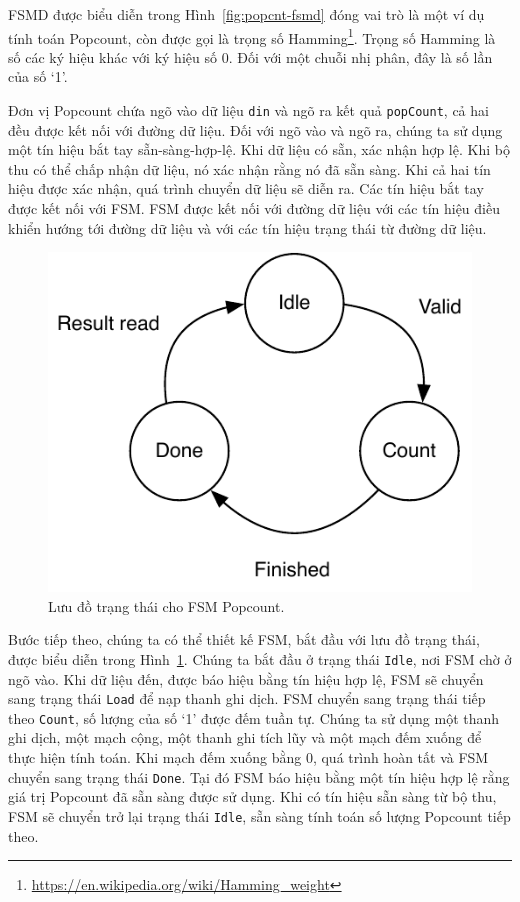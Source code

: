 \documentclass[%
    10pt,
    headinclude, footexclude,
    openright, %
    notitlepage,
    cleardoubleempty,
    headsepline,
    pointlessnumbers,
    bibtotoc, idxtotoc,
    ]{scrbook}
\newcommand{\code}[1]{{\small{\texttt{#1}}}}
\newcommand{\scale}{0.7}
\newcommand{\myref}[2]{\href{#1}{#2}}
\renewcommand{\myref}[2]{{#2}{\footnote{\url{#1}}}}
\begin{document}
FSMD được biểu diễn trong Hình~\ref{fig:popcnt-fsmd} đóng vai trò là một ví dụ tính toán Popcount, còn được gọi là \myref{https://en.wikipedia.org/wiki/Hamming_weight}{trọng số Hamming}. Trọng số Hamming là số các ký hiệu khác với ký hiệu số 0. Đối với một chuỗi nhị phân, đây là số lần của số `1'. 

Đơn vị Popcount chứa ngõ vào dữ liệu \code{din} và ngõ ra kết quả \code{popCount}, cả hai đều được kết nối với đường dữ liệu. Đối với ngõ vào và ngõ ra, chúng ta sử dụng một tín hiệu bắt tay sẵn-sàng-hợp-lệ. Khi dữ liệu có sẵn, xác nhận hợp lệ. Khi bộ thu có thể chấp nhận dữ liệu, nó xác nhận rằng nó đã sẵn sàng. Khi cả hai tín hiệu được xác nhận, quá trình chuyển dữ liệu sẽ diễn ra. Các tín hiệu bắt tay được kết nối với FSM. FSM được kết nối với đường dữ liệu với các tín hiệu điều khiển hướng tới đường dữ liệu và với các tín hiệu trạng thái từ đường dữ liệu. 


\begin{figure}
  \centering
  \includegraphics[scale=\scale]{figures/popcnt-states}
  \caption{Lưu đồ trạng thái cho FSM Popcount.}
  \label{fig:popcnt-states}
\end{figure}

Bước tiếp theo, chúng ta có thể thiết kế FSM, bắt đầu với lưu đồ trạng thái, được biểu diễn trong Hình~\ref{fig:popcnt-states}. Chúng ta bắt đầu ở trạng thái \code{Idle}, nơi FSM chờ ở ngõ vào. Khi dữ liệu đến, được báo hiệu bằng tín hiệu hợp lệ, FSM sẽ chuyển sang trạng thái \code{Load} để nạp thanh ghi dịch. FSM chuyển sang trạng thái tiếp theo \code{Count}, số lượng của số `1' được đếm tuần tự. Chúng ta sử dụng một thanh ghi dịch, một mạch cộng, một thanh ghi tích lũy và một mạch đếm xuống để thực hiện tính toán. Khi mạch đếm xuống bằng 0, quá trình hoàn tất và FSM chuyển sang trạng thái \code{Done}. Tại đó FSM báo hiệu bằng một tín hiệu hợp lệ rằng giá trị Popcount đã sẵn sàng được sử dụng. Khi có tín hiệu sẵn sàng từ bộ thu, FSM sẽ chuyển trở lại trạng thái \code{Idle}, sẵn sàng tính toán số lượng Popcount tiếp theo.
\end{document}
